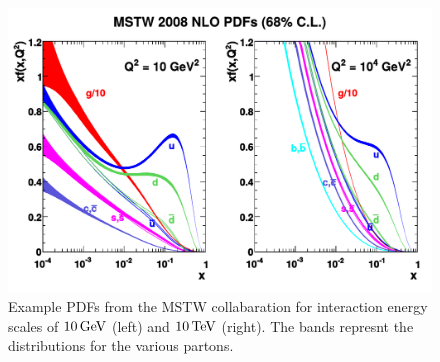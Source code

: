 \begin{figure}[!htb]
    \centering
    \includegraphics[width=\textwidth]{figures/mstw_pdfs.pdf}
    \caption[
        Example PDFs from the MSTW collabaration.
    ]{
        Example PDFs from the MSTW collabaration for interaction energy scales
        of $10 \,\text{Ge\hspace{-.08em}V}$ (left) and $10 \,\text{Te\hspace{-.08em}V}$ (right). The bands represnt the
         distributions for the various partons.
    }
    \label{fig:mstw_pdf}
\end{figure}
